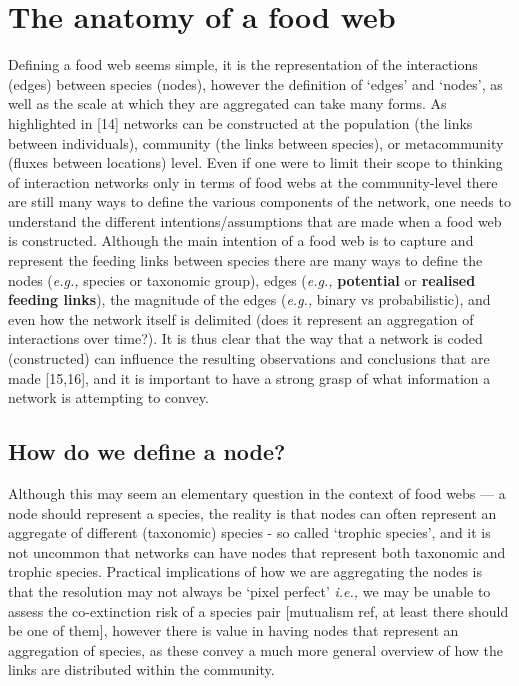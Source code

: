 \documentclass[
]{article}
\begin{document}
\section{The anatomy of a food web}\label{sec-network-anatomy}

Defining a food web seems simple, it is the representation of the
interactions (edges) between species (nodes), however the definition of
`edges' and `nodes', as well as the scale at which they are aggregated
can take many forms. As highlighted in {[}14{]} networks can be
constructed at the population (the links between individuals), community
(the links between species), or metacommunity (fluxes between locations)
level. Even if one were to limit their scope to thinking of interaction
networks only in terms of food webs at the community-level there are
still many ways to define the various components of the network, one
needs to understand the different intentions/assumptions that are made
when a food web is constructed. Although the main intention of a food
web is to capture and represent the feeding links between species there
are many ways to define the nodes (\emph{e.g.,} species or taxonomic
group), edges (\emph{e.g.,} \textbf{potential} or \textbf{realised
feeding links}), the magnitude of the edges (\emph{e.g.,} binary vs
probabilistic), and even how the network itself is delimited (does it
represent an aggregation of interactions over time?). It is thus clear
that the way that a network is coded (constructed) can influence the
resulting observations and conclusions that are made {[}15,16{]}, and it
is important to have a strong grasp of what information a network is
attempting to convey.

\subsection{How do we define a node?}\label{how-do-we-define-a-node}

Although this may seem an elementary question in the context of food
webs --- a node should represent a species, the reality is that nodes
can often represent an aggregate of different (taxonomic) species - so
called `trophic species', and it is not uncommon that networks can have
nodes that represent both taxonomic and trophic species. Practical
implications of how we are aggregating the nodes is that the resolution
may not always be `pixel perfect' \emph{i.e.,} we may be unable to
assess the co-extinction risk of a species pair {[}mutualism ref, at
least there should be one of them{]}, however there is value in having
nodes that represent an aggregation of species, as these convey a much
more general overview of how the links are distributed within the
community.
\end{document}
